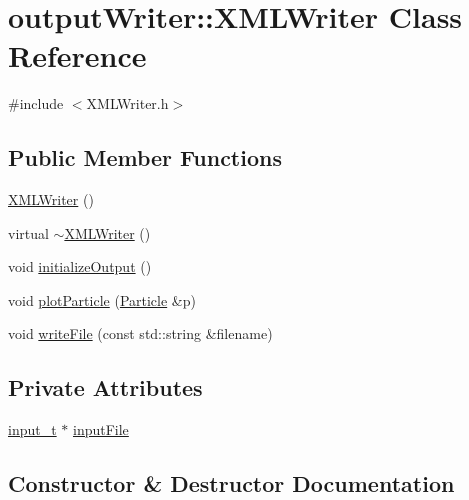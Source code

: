 \hypertarget{classoutputWriter_1_1XMLWriter}{}\section{output\+Writer\+:\+:X\+M\+L\+Writer Class Reference}
\label{classoutputWriter_1_1XMLWriter}


{\ttfamily \#include $<$X\+M\+L\+Writer.\+h$>$}

\subsection*{Public Member Functions}
\begin{DoxyCompactItemize}
\item 
\hyperlink{classoutputWriter_1_1XMLWriter_ab8b88d72ae8f03771346c10c3b42f014}{X\+M\+L\+Writer} ()
\item 
virtual \hyperlink{classoutputWriter_1_1XMLWriter_a155a75536811aeb1a0d87d9677b04f0e}{$\sim$\+X\+M\+L\+Writer} ()
\item 
void \hyperlink{classoutputWriter_1_1XMLWriter_ae263500bf16da212016fe61a2f28bff7}{initialize\+Output} ()
\item 
void \hyperlink{classoutputWriter_1_1XMLWriter_a0ca78cf991cb34d48ae73420bc37ff08}{plot\+Particle} (\hyperlink{classParticle}{Particle} \&p)
\item 
void \hyperlink{classoutputWriter_1_1XMLWriter_adcccb8d6c33ae7e6408597a55bfa7f7a}{write\+File} (const std\+::string \&filename)
\end{DoxyCompactItemize}
\subsection*{Private Attributes}
\begin{DoxyCompactItemize}
\item 
\hyperlink{classinput__t}{input\+\_\+t} $\ast$ \hyperlink{classoutputWriter_1_1XMLWriter_ad9f7b00f811d520043497bbe15b5c078}{input\+File}
\end{DoxyCompactItemize}


\subsection{Constructor \& Destructor Documentation}
